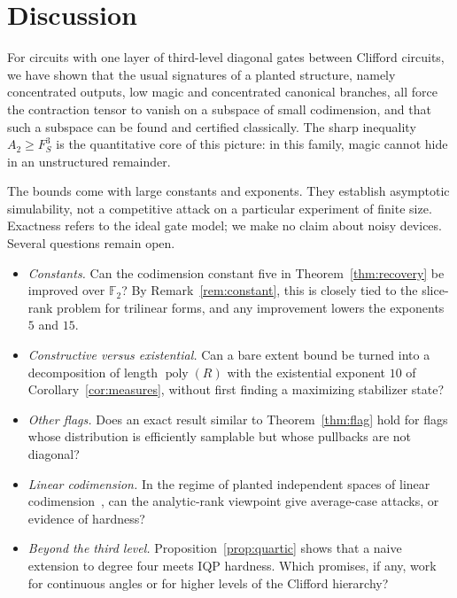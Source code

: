 \documentclass[a4paper,onecolumn,11pt,unpublished]{quantumarticle}
\theoremstyle{plain}
\theoremstyle{remark}
\newcommand{\F}{\mathbb{F}_2}
\DeclareMathOperator{\poly}{poly}
\begin{document}
\section{Discussion}\label{sec:discussion}

For circuits with one layer of third-level diagonal gates between Clifford circuits, we have shown that the usual signatures of a planted structure, namely concentrated outputs, low magic and concentrated canonical branches, all force the contraction tensor to vanish on a subspace of small codimension, and that such a subspace can be found and certified classically. The sharp inequality $A_2\ge F_S^3$ is the quantitative core of this picture: in this family, magic cannot hide in an unstructured remainder.

The bounds come with large constants and exponents. They establish asymptotic simulability, not a competitive attack on a particular experiment of finite size. Exactness refers to the ideal gate model; we make no claim about noisy devices. Several questions remain open.
\begin{itemize}
\item \emph{Constants.} Can the codimension constant five in Theorem~\ref{thm:recovery} be improved over $\F$? By Remark~\ref{rem:constant}, this is closely tied to the slice-rank problem for trilinear forms, and any improvement lowers the exponents $5$ and $15$.
\item \emph{Constructive versus existential.} Can a bare extent bound be turned into a decomposition of length $\poly(R)$ with the existential exponent $10$ of Corollary~\ref{cor:measures}, without first finding a maximizing stabilizer state?
\item \emph{Other flags.} Does an exact result similar to Theorem~\ref{thm:flag} hold for flags whose distribution is efficiently samplable but whose pullbacks are not diagonal?
\item \emph{Linear codimension.} In the regime of planted independent spaces of linear codimension~\cite{BGHLQ26}, can the analytic-rank viewpoint give average-case attacks, or evidence of hardness?
\item \emph{Beyond the third level.} Proposition~\ref{prop:quartic} shows that a naive extension to degree four meets IQP hardness. Which promises, if any, work for continuous angles or for higher levels of the Clifford hierarchy?
\end{itemize}
\end{document}
